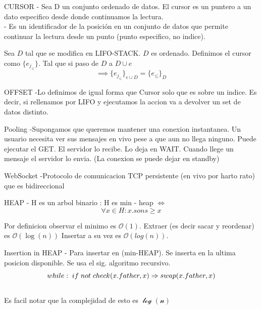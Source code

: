 \begin{Definition}{CURSOR}
    - Sea D un conjunto ordenado de datos. El cursor es un puntero a un dato especifico desde donde 
    continuamos la lectura. \\
    - Es un identificador de la posición en un conjunto de datos que permite
    continuar la lectura desde un punto (punto especifico, no indice). 
\end{Definition}

Sea $D$ tal que se modifica en LIFO-STACK. $D$ es ordenado. 
Definimos el cursor como $\{e_{j_\leq} \}$. Tal que si paso de $D$ a $D \cup e$
$$ \implies \{ e_{j_{\leq}} \}_{e \cup D} = \{ e_\leq \}_{D} $$

\begin{Definition}{OFFSET}
    -Lo definimos de igual forma que Cursor solo que es sobre un indice. Es decir, si rellenamos por LIFO y ejecutamos
    la accion va a devolver un set de datos distinto.
\end{Definition}

\begin{Lemma}{Pooling}
    -Supongamos que queremos mantener una conexion instantanea. 
    Un usuario necesita ver sus mensajes en vivo pese a que aun no llega ninguno. 
    Puede ejecutar el GET. El servidor lo recibe. Lo deja en WAIT. Cuando llege un mensaje el 
    servidor lo envia. (La conexion se puede dejar en standby)
\end{Lemma}

\begin{Definition}{WebSocket}
    -Protocolo  de comunicacion TCP persistente (en vivo por harto rato) que es bidireccional
\end{Definition}

\begin{Definition}{HEAP}
     - H es un arbol binario : H es min - heap $\iff$
    $$ \forall x \in H: x.sons \geq x $$
\end{Definition}
Por definicion observar el minimo es $\mathcal{O}(1)$. 
Extraer (es decir sacar y reordenar) es $\mathcal{O}(\log (n))$
Insertar a su vez es $\mathcal{O}(log (n))$. 
\begin{Lemma}{Insertion in HEAP}
    - Para insertar en (min-HEAP). Se inserta en la ultima posicion disponible. 
    Se usa el sig. algoritmo recursivo. 
        $$while: \; if \; not \; check(x.father, x) \Rightarrow swap(x.father, x)$$ \\
    Es facil notar que la complejidad de esto es $\mathcal{\log(n)}$
\end{Lemma}

